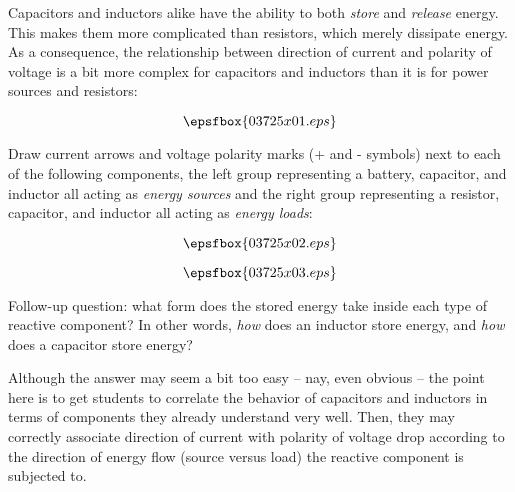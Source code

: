 

Capacitors and inductors alike have the ability to both {\it store} and {\it release} energy.  This makes them more complicated than resistors, which merely dissipate energy.  As a consequence, the relationship between direction of current and polarity of voltage is a bit more complex for capacitors and inductors than it is for power sources and resistors:

$$\epsfbox{03725x01.eps}$$

Draw current arrows and voltage polarity marks (+ and - symbols) next to each of the following components, the left group representing a battery, capacitor, and inductor all acting as {\it energy sources} and the right group representing a resistor, capacitor, and inductor all acting as {\it energy loads}:

$$\epsfbox{03725x02.eps}$$







$$\epsfbox{03725x03.eps}$$

\vskip 10pt

Follow-up question: what form does the stored energy take inside each type of reactive component?  In other words, {\it how} does an inductor store energy, and {\it how} does a capacitor store energy?







Although the answer may seem a bit too easy -- nay, even obvious -- the point here is to get students to correlate the behavior of capacitors and inductors in terms of components they already understand very well.  Then, they may correctly associate direction of current with polarity of voltage drop according to the direction of energy flow (source versus load) the reactive component is subjected to.




